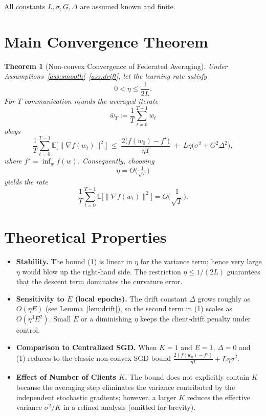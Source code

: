 \documentclass{article}
\newcommand{\E}{\mathbb{E}}
\newtheorem{theorem}{Theorem}
\begin{document}
All constants $L,\sigma,G,\Delta$ are assumed known and finite.

\section*{Main Convergence Theorem}
\begin{theorem}[Non‑convex Convergence of Federated Averaging]\label{thm:main}
Under Assumptions~\ref{ass:smooth}–\ref{ass:drift}, let the learning rate satisfy
\[
0<\eta\le\frac{1}{2L}.
\]
For $T$ communication rounds the averaged iterate
\[
\bar w_T:=\frac1T\sum_{t=0}^{T-1}w_t
\]
obeys
\[
\boxed{
\frac1T\sum_{t=0}^{T-1}\E\!\big[\|\nabla f(w_t)\|^2\big]\;
\le\;
\frac{2\big(f(w_0)-f^\star\big)}{\eta T}
\;+\;
L\eta\big(\sigma^2+G^2\Delta^2\big),
}
\tag{1}
\]
where $f^\star=\inf_{w}f(w)$. Consequently, choosing
\[
\eta = \Theta\!\big(\tfrac{1}{\sqrt{T}}\big)
\]
yields the rate
\[
\frac1T\sum_{t=0}^{T-1}\E\!\big[\|\nabla f(w_t)\|^2\big]=
O\!\Big(\frac{1}{\sqrt{T}}\Big).
\]
\end{theorem}

\section*{Theoretical Properties}
\begin{itemize}[leftmargin=*]
\item \textbf{Stability.} The bound (1) is linear in $\eta$ for the variance term;
hence very large $\eta$ would blow up the right‑hand side. The restriction
$\eta\le 1/(2L)$ guarantees that the descent term dominates the curvature
error.
\item \textbf{Sensitivity to $E$ (local epochs).} The drift constant
$\Delta$ grows roughly as $O(\eta E)$ (see Lemma~\ref{lem:drift}), so the second
term in (1) scales as $O(\eta^3E^2)$. Small $E$ or a diminishing $\eta$ keeps the
client‑drift penalty under control.
\item \textbf{Comparison to Centralized SGD.} When $K=1$ and $E=1$,
$\Delta=0$ and (1) reduces to the classic non‑convex SGD bound
$\frac{2(f(w_0)-f^\star)}{\eta T}+L\eta\sigma^2$.
\item \textbf{Effect of Number of Clients $K$.} The bound does not explicitly
contain $K$ because the averaging step eliminates the variance contributed
by the independent stochastic gradients; however, a larger $K$ reduces the
effective variance $\sigma^2/K$ in a refined analysis (omitted for brevity).
\end{itemize}
\end{document}
